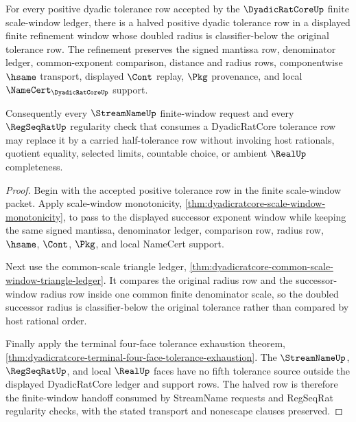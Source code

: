 \begin{theorem}\label{thm:dyadicratcore-tolerance-halving-cover}
For every positive dyadic tolerance row accepted by the $\DyadicRatCoreUp$ finite scale-window ledger, there is a halved positive dyadic tolerance row in a displayed finite refinement window whose doubled radius is classifier-below the original tolerance row. The refinement preserves the signed mantissa row, denominator ledger, common-exponent comparison, distance and radius rows, componentwise $\hsame$ transport, displayed $\Cont$ replay, $\Pkg$ provenance, and local $\NameCert_{\DyadicRatCoreUp}$ support.

Consequently every $\StreamNameUp$ finite-window request and every $\RegSeqRatUp$ regularity check that consumes a DyadicRatCore tolerance row may replace it by a carried half-tolerance row without invoking host rationals, quotient equality, selected limits, countable choice, or ambient $\RealUp$ completeness.
\end{theorem}
\begin{proof}
Begin with the accepted positive tolerance row in the finite scale-window packet. Apply scale-window monotonicity, \autoref{thm:dyadicratcore-scale-window-monotonicity}, to pass to the displayed successor exponent window while keeping the same signed mantissa, denominator ledger, comparison row, radius row, $\hsame$, $\Cont$, $\Pkg$, and local NameCert support.

Next use the common-scale triangle ledger, \autoref{thm:dyadicratcore-common-scale-window-triangle-ledger}. It compares the original radius row and the successor-window radius row inside one common finite denominator scale, so the doubled successor radius is classifier-below the original tolerance rather than compared by host rational order.

Finally apply the terminal four-face tolerance exhaustion theorem, \autoref{thm:dyadicratcore-terminal-four-face-tolerance-exhaustion}. The $\StreamNameUp$, $\RegSeqRatUp$, and local $\RealUp$ faces have no fifth tolerance source outside the displayed DyadicRatCore ledger and support rows. The halved row is therefore the finite-window handoff consumed by StreamName requests and RegSeqRat regularity checks, with the stated transport and nonescape clauses preserved.
\end{proof}

